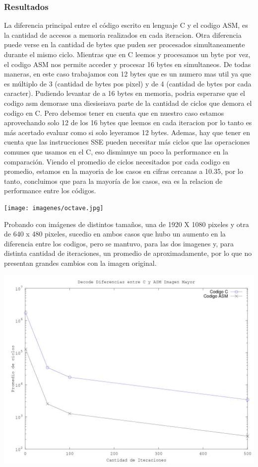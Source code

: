 \subsubsection{Resultados}
La diferencia principal entre el c\'odigo escrito en lenguaje C y el c\´odigo ASM, es la cantidad de accesos a memoria realizados en cada iteraci\´on. Otra diferencia puede verse en la cantidad de bytes que puden ser procesados simultaneamente durante el mismo ciclo. Mientras que en C leemos y procesamos un byte por vez, el c\´odigo ASM nos permite acceder y procesar 16 bytes en simultaneos. De todas maneras, en este caso trabajamos con 12 bytes que es un numero mas \´util ya que es múltiplo de 3 (cantidad de bytes pos pixel)  y de 4 (cantidad de bytes por cada caracter).
\newline
Pudiendo levantar de a 16 bytes en memoria, podr\´ia esperarse que el c\´odigo asm demorase una diesiseiava parte de la cantidad de ciclos que demora el c\´odigo en C. Pero debemos tener en cuenta que en nuestro caso estamos aprovechando solo 12 de los 16 bytes que leemos en cada iteraci\´on por lo tanto es más acertado evaluar como si solo leyeramos 12 bytes. Adem\´as, hay que tener en cuenta que las instrucciones SSE pueden necesitar más ciclos que las operaciones comunes que usamos en el C, eso disminuye un poco la performance en la comparación. Viendo el promedio de ciclos necesitados por cada c\´odigo en promedio, estamos en la mayor\´ia de los casos en cifras cercanas a 10.35, por lo tanto, concluimos que para la mayoría de los casos, esa es la relaci\´on de performance entre los códigos.
\newline

\texttt{[image: imagenes/octave.jpg]}

Probando con im\'agenes de distintos tamaños, una de 1920 X 1080 p\´ixeles y otra de 640 x 480 p\´ixeles, sucedi\´o en ambos casos que hubo un aumento en la diferencia entre los c\´odigos, pero se mantuvo, para las dos im\´agenes y, para distinta cantidad de iteraciones, un promedio de aproximadamente, por lo que no presentan grandes cambios con la imagen original. 

\includegraphics{imagenes/DecodeMayor.jpg}

